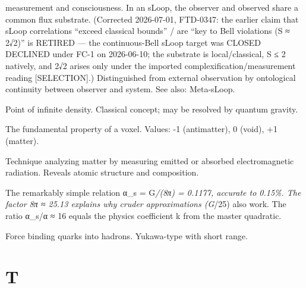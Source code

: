 \documentclass[
  11pt,
  letterpaper,
  twoside,
  openright]{book}
\begin{document}
\begin{description}
measurement and consciousness. In an sLoop, the observer and observed
share a common flux substrate. (Corrected 2026-07-01, FTD-0347: the
earlier claim that sLoop correlations ``exceed classical bounds'' / are
``key to Bell violations (S ≈ 2√2)'' is RETIRED --- the continuous-Bell
sLoop target was CLOSED DECLINED under FC-1 on 2026-06-10; the substrate
is local/classical, S ≤ 2 natively, and 2√2 arises only under the
imported complexification/measurement reading {[}SELECTION{]}.)
Distinguished from external observation by ontological continuity
between observer and system. See also: Meta-sLoop.
\item[\textbf{Singularity}]
Point of infinite density. Classical concept; may be resolved by quantum
gravity.
\item[\textbf{State}]
The fundamental property of a voxel. Values: -1 (antimatter), 0 (void),
+1 (matter).
\item[\textbf{Spectroscopy}]
Technique analyzing matter by measuring emitted or absorbed
electromagnetic radiation. Reveals atomic structure and composition.
\item[**Strong Coupling (G*/π Formula)**]
The remarkably simple relation α\_s = G\emph{/(8π) = 0.1177, accurate to
0.15\%. The factor 8π ≈ 25.13 explains why cruder approximations (G}/25)
also work. The ratio α\_s/α ≈ 16 equals the physics coefficient k from
the master quadratic.
\item[\textbf{Strong Force}]
Force binding quarks into hadrons. Yukawa-type with short range.
\end{description}

\section{T}\label{t}
\end{document}
